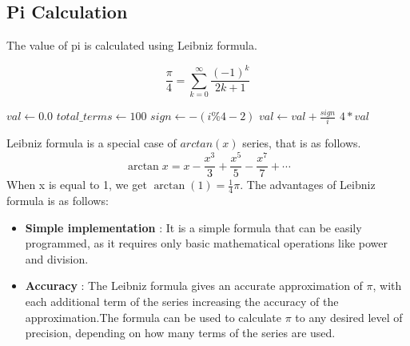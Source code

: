 \documentclass{report}
\begin{document}
\subsection{Pi Calculation}
\begin{flushleft}
  The value of pi is calculated using Leibniz formula.
\end{flushleft}
$${\frac {\pi }{4}}=\sum _{k=0}^{\infty }{\frac {(-1)^{k}}{2k+1}}$$
\begin{algorithmic}[1]
        \State $val \gets 0.0$
        \State $total\_terms \gets 100$
            \State $sign \gets -(i\%4-2)$
            \State $val \gets val + \frac{sign}{i}$
        \EndFor
        \State \Return $4 * val$
    \EndFunction
\end{algorithmic}
\begin{flushleft}
  Leibniz formula is a special case of $arctan(x)$ series, that is as follows.
  $$\arctan x=x-{\frac {x^{3}}{3}}+{\frac {x^{5}}{5}}-{\frac {x^{7}}{7}}+\cdots$$
  When x is equal to 1, we get $\arctan(1) = {\frac{1}{4}}\pi.$
  The advantages of Leibniz formula is as follows:
  \begin{itemize}
    \item \textbf{Simple implementation} : It is a simple formula that can be easily programmed, as it requires only basic mathematical operations like power and division.
    \item \textbf{Accuracy} : The Leibniz formula gives an accurate approximation of $\pi$, with each additional term of the series increasing the accuracy of the approximation.The formula can be used to calculate $\pi$ to any desired level of precision, depending on how many terms of the series are used.
  \end{itemize}
\end{flushleft}
\end{document}
